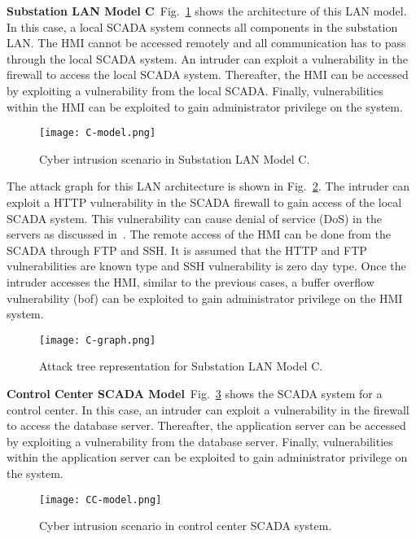 \noindent\textbf{Substation LAN Model C}\ 
Fig.~\ref{fig:model-C} shows the architecture of this LAN model. In this case, a local SCADA system connects all components in the substation LAN. The HMI cannot be accessed remotely and all communication has to pass through the local SCADA system. An intruder can exploit a vulnerability in the firewall to access the local SCADA system. Thereafter, the HMI can be accessed by exploiting a vulnerability from the local SCADA. Finally, vulnerabilities within the HMI can be exploited to gain administrator privilege on the system.
\begin{figure}[htbp]
	\centering
	\texttt{[image: C-model.png]}
	\caption{Cyber intrusion scenario in Substation LAN Model C.}
	\label{fig:model-C}
\end{figure}

The attack graph for this LAN architecture is shown in Fig.~\ref{fig:graph-C}. The intruder can exploit a HTTP vulnerability in the SCADA firewall to gain access of the local SCADA system. This vulnerability can cause denial of service (DoS) in the servers as discussed in~\cite{http}. The remote access of the HMI can be done from the SCADA through FTP and SSH. It is assumed that the HTTP and FTP vulnerabilities are known type and SSH vulnerability is zero day type. Once the intruder accesses the HMI, similar to the previous cases, a buffer overflow vulnerability (bof) can be exploited to gain administrator privilege on the HMI system.
\begin{figure}[htbp]
	\centering
	\texttt{[image: C-graph.png]}
	\caption{Attack tree representation for Substation LAN Model C.}
	\label{fig:graph-C}
\end{figure}

\noindent\textbf{Control Center SCADA Model}\ 
Fig.~\ref{fig:model-CC} shows the SCADA system for a control center. In this case, an intruder can exploit a vulnerability in the firewall to access the database server. Thereafter, the application server can be accessed by exploiting a vulnerability from the database server. Finally, vulnerabilities within the application server can be exploited to gain administrator privilege on the system.
\begin{figure}[htbp]
	\centering
	\texttt{[image: CC-model.png]}
	\caption{Cyber intrusion scenario in control center SCADA system.}
	\label{fig:model-CC}
\end{figure}

